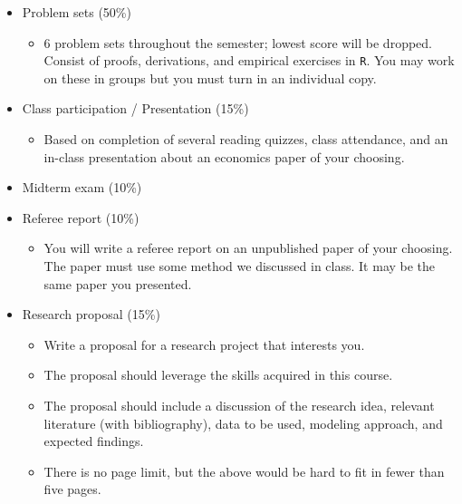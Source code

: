 \documentclass[11pt,english]{article}
\begin{document}
\begin{itemize}
\item Problem sets (50\%)
    \begin{itemize}
        \item 6 problem sets throughout the semester; lowest score will be dropped. Consist of proofs, derivations, and empirical exercises in \texttt{R}. You may work on these in groups but you must turn in an individual copy.
    \end{itemize}
\item Class participation / Presentation (15\%)
    \begin{itemize}
        \item Based on completion of several reading quizzes, class attendance, and an in-class presentation about an economics paper of your choosing.
    \end{itemize}
\item Midterm exam (10\%)
\item Referee report (10\%)
    \begin{itemize}
        \item You will write a referee report on an unpublished paper of your choosing. The paper must use some method we discussed in class. It may be the same paper you presented.
    \end{itemize}
\item Research proposal (15\%)
    \begin{itemize}
        \item Write a proposal for a research project that interests you.
        \item The proposal should leverage the skills acquired in this course.
        \item The proposal should include a discussion of the research idea, relevant literature (with bibliography), data to be used, modeling approach, and expected findings.
        \item There is no page limit, but the above would be hard to fit in fewer than five pages.
    \end{itemize}
\end{itemize}
\end{document}
